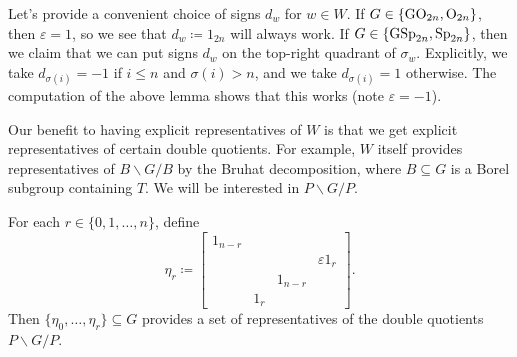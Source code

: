 \begin{remark}
    Let's provide a convenient choice of signs $d_w$ for $w\in W$. If $G\in\{\mathrm{GO}_{2n},\mathrm{O}_{2n}\}$, then $\varepsilon=1$, so we see that $d_w\coloneqq1_{2n}$ will always work. If $G\in\{\mathrm{GSp}_{2n},\mathrm{Sp}_{2n}\}$, then we claim that we can put signs $d_w$ on the top-right quadrant of $\sigma_w$. Explicitly, we take $d_{\sigma(i)}=-1$ if $i\le n$ and $\sigma(i)>n$, and we take $d_{\sigma(i)}=1$ otherwise. The computation of the above lemma shows that this works (note $\varepsilon=-1$).
\end{remark}
Our benefit to having explicit representatives of $W$ is that we get explicit representatives of certain double quotients. For example, $W$ itself provides representatives of $B\backslash G/B$ by the Bruhat decomposition, where $B\subseteq G$ is a Borel subgroup containing $T$. We will be interested in $P\backslash G/P$.
\begin{lemma} \label{lem:compute-pgp}
    For each $r\in\{0,1,\ldots,n\}$, define
    \[\eta_r\coloneqq\begin{bmatrix}
        1_{n-r} \\ &&& \varepsilon1_r \\
        && 1_{n-r} \\
        & 1_r
    \end{bmatrix}.\]
    Then $\{\eta_0,\ldots,\eta_r\}\subseteq G$ provides a set of representatives of the double quotients $P\backslash G/P$.
\end{lemma}
